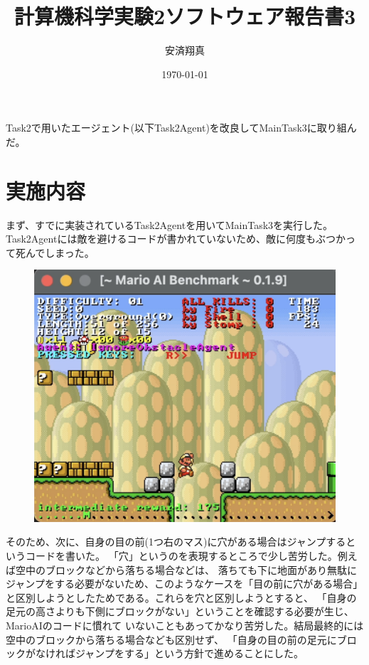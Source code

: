 \documentclass[a4paper,11pt]{jsarticle}
\begin{document}
\title{計算機科学実験2ソフトウェア報告書3}
\author{安済翔真}
\date{\today}
\maketitle

Task2で用いたエージェント(以下Task2Agent)を改良してMainTask3に取り組んだ。

\section*{実施内容}

まず、すでに実装されているTask2Agentを用いてMainTask3を実行した。
Task2Agentには敵を避けるコードが書かれていないため、敵に何度もぶつかって死んでしまった。

\begin{figure}[h]
  \centering
  \includegraphics*[scale=0.3]{
    images/report2/ignore-obstacle-fail.png
  }
  \caption[図1]{}
\end{figure}

そのため、次に、自身の目の前(1つ右のマス)に穴がある場合はジャンプするというコードを書いた。
「穴」というのを表現するところで少し苦労した。例えば空中のブロックなどから落ちる場合などは、
落ちても下に地面があり無駄にジャンプをする必要がないため、このようなケースを「目の前に穴がある場合」
と区別しようとしたためである。これらを穴と区別しようとすると、
「自身の足元の高さよりも下側にブロックがない」ということを確認する必要が生じ、MarioAIのコードに慣れて
いないこともあってかなり苦労した。結局最終的には空中のブロックから落ちる場合なども区別せず、
「自身の目の前の足元にブロックがなければジャンプをする」という方針で進めることにした。
\end{document}
